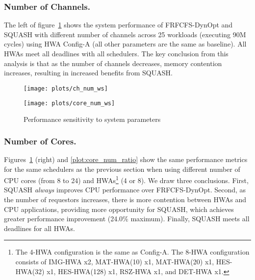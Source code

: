 \documentclass[10pt,letterpaper]{article}
\newif\ifSQUEEZE
\begin{document}
\subsubsection{Number of Channels.} 
\ifSQUEEZE
Figure~\ref{plot:ch_num_results} (left) shows the system performance
with different number of channels across 25 workloads
(executing 90M cycles) using HWA Config-A (all other parameters are the
same as baseline). 
All HWAs meet all deadlines with all schedulers as there is ample bandwidth. The key
conclusion is that as the number of channels decreases, memory contention increases, 
resulting in increased benefits from SQUASH.
\else
The left of figure~\ref{plot:ch_num_results} shows the system performance of
FRFCFS-DynOpt and SQUASH with different number of channels across 25 workloads
(executing 90M cycles) using HWA Config-A (all other parameters are the
same as baseline). 
All HWAs meet all deadlines with all schedulers. The key
conclusion from this analysis is that as the number of
channels decreases, memory contention increases, resulting in increased benefits
from SQUASH.
\fi








\begin{figure}[ht!]
  \centering
  \begin{minipage}{0.40\textwidth}
    \centering
    \texttt{[image: plots/ch\_num\_ws]}
  \end{minipage}
\begin{minipage}{0.40\textwidth}
    \centering
    \texttt{[image: plots/core\_num\_ws]}
  \end{minipage}
\caption{Performance sensitivity to system parameters}
  \label{plot:ch_num_results}
\end{figure}






\subsubsection{Number of Cores.} 







Figures~\ref{plot:ch_num_results} (right) and \ref{plot:core_num_ratio} show the same
performance metrics for the same schedulers as the previous section when using
different number of CPU cores (from 8 to 24) and HWAs\footnote{The 4-HWA
configuration is the same as Config-A. The 8-HWA configuration consists of
IMG-HWA x2, MAT-HWA(10) x1, MAT-HWA(20) x1, HES-HWA(32) x1, HES-HWA(128) x1,
RSZ-HWA x1, and DET-HWA x1. } (4 or 8). We draw three conclusions. First, SQUASH
\emph{always} improves CPU performance over FRFCFS-DynOpt. Second, as the number
of requestors increases, there is more contention between HWAs and CPU
applications, providing more opportunity for SQUASH, which achieves greater
performance improvement (24.0\% maximum).
Finally, SQUASH meets all deadlines for all HWAs.
\end{document}
